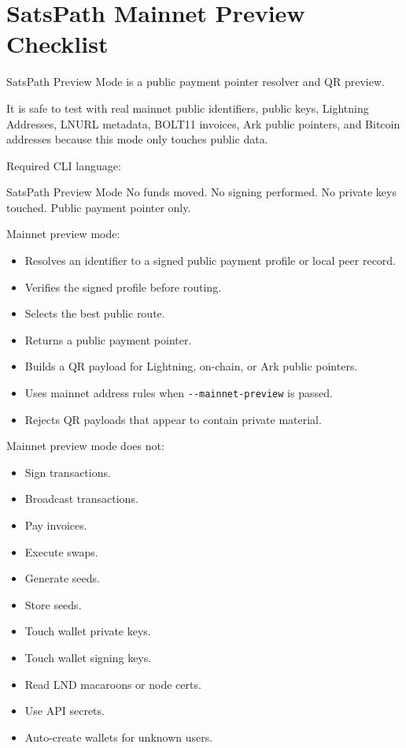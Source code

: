 \documentclass[
]{article}
\author{}
\date{}
\newenvironment{Shaded}{}{}
\newcommand{\NormalTok}[1]{#1}
\providecommand{\tightlist}{%
  \setlength{\itemsep}{0pt}\setlength{\parskip}{0pt}}
\begin{document}
\hypertarget{satspath-mainnet-preview-checklist}{%
\section{SatsPath Mainnet Preview
Checklist}\label{satspath-mainnet-preview-checklist}}

SatsPath Preview Mode is a public payment pointer resolver and QR
preview.

It is safe to test with real mainnet public identifiers, public keys,
Lightning Addresses, LNURL metadata, BOLT11 invoices, Ark public
pointers, and Bitcoin addresses because this mode only touches public
data.

Required CLI language:

\begin{Shaded}
\begin{Highlighting}[]
\NormalTok{SatsPath Preview Mode}
\NormalTok{No funds moved.}
\NormalTok{No signing performed.}
\NormalTok{No private keys touched.}
\NormalTok{Public payment pointer only.}
\end{Highlighting}
\end{Shaded}

Mainnet preview mode:

\begin{itemize}
\tightlist
\item
  Resolves an identifier to a signed public payment profile or local
  peer record.
\item
  Verifies the signed profile before routing.
\item
  Selects the best public route.
\item
  Returns a public payment pointer.
\item
  Builds a QR payload for Lightning, on-chain, or Ark public pointers.
\item
  Uses mainnet address rules when \texttt{-\/-mainnet-preview} is
  passed.
\item
  Rejects QR payloads that appear to contain private material.
\end{itemize}

Mainnet preview mode does not:

\begin{itemize}
\tightlist
\item
  Sign transactions.
\item
  Broadcast transactions.
\item
  Pay invoices.
\item
  Execute swaps.
\item
  Generate seeds.
\item
  Store seeds.
\item
  Touch wallet private keys.
\item
  Touch wallet signing keys.
\item
  Read LND macaroons or node certs.
\item
  Use API secrets.
\item
  Auto-create wallets for unknown users.
\end{itemize}
\end{document}
